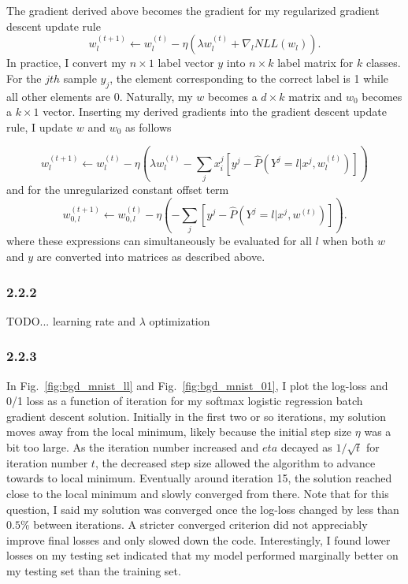 \documentclass[12pt]{amsart}
\begin{document}
The gradient derived above becomes the gradient for my regularized gradient descent update rule
\begin{equation}
 w_l^{(t+1)} \leftarrow w_l^{(t)} - \eta (\lambda w_l^{(t)} + \nabla_l NLL(w_l)).
 \end{equation}
 In practice, I convert my $n \times 1$ label vector $y$ into $n \times k$ label matrix for $k$ classes.  For the $jth$ sample $y_j$, the element corresponding to the correct label is 1 while all other elements are 0.  Naturally, my $w$ becomes a $d \times k$ matrix and $w_0$ becomes a $k \times 1$ vector.  Inserting my derived gradients into the gradient descent update rule, I update $w$ and $w_0$ as follows
 
 \begin{equation}
w^{(t+1)}_l \leftarrow w^{(t)}_l - \eta (\lambda w^{(t)}_l - \sum_j x^j_i[y^j - \hat{P}(Y^j = l | x^j, w_l^{(t)})])
\end{equation}
and for the unregularized constant offset term
\begin{equation}
w^{(t+1)}_{0,l} \leftarrow w^{(t)}_{0,l} - \eta (- \sum_j[y^j - \hat{P}(Y^j = l | x^j, w^{(t)})]).
\end{equation}
where these expressions can simultaneously be evaluated for all $l$ when both $w$ and $y$ are converted into matrices as described above.

\subsubsection*{2.2.2}

TODO... learning rate and $\lambda$ optimization

\subsubsection*{2.2.3}

In Fig.~\ref{fig:bgd_mnist_ll} and Fig.~\ref{fig:bgd_mnist_01}, I plot the log-loss and 0/1 loss as a function of iteration for my softmax logistic regression batch gradient descent solution.  Initially in the first two or so iterations, my solution moves away from the local minimum, likely because the initial step size $\eta$ was a bit too large.  As the iteration number increased and $eta$ decayed as $1/\sqrt{t}$ for iteration number $t$, the decreased step size allowed the algorithm to advance towards to local minimum.  Eventually around iteration 15, the solution reached close to the local minimum and slowly converged from there.  Note that for this question, I said my solution was converged once the log-loss changed by less than $0.5\%$ between iterations.  A stricter converged criterion did not appreciably improve final losses and only slowed down the code.  Interestingly, I found lower losses on my testing set indicated that my model performed marginally better on my testing set than the training set.
\end{document}
